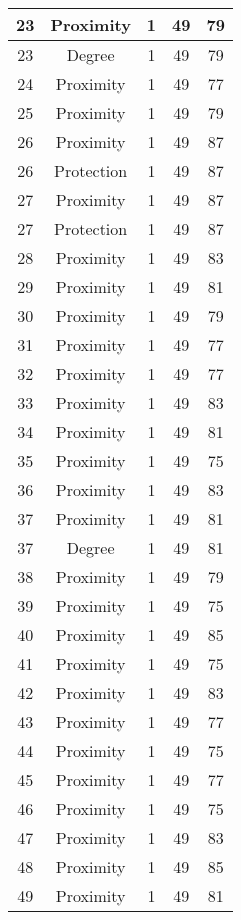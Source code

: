 \documentclass[results.tex]{subfiles}
\begin{document}
\begin{center}
\begin{tabular}{| c || c | c | c | c |}
    \hline
    23 & Proximity & 1 & 49 & 79 \\ 
    \hline
    23 & Degree & 1 & 49 & 79 \\ 
    \hline
    24 & Proximity & 1 & 49 & 77 \\ 
    \hline
    25 & Proximity & 1 & 49 & 79 \\ 
    \hline
    26 & Proximity & 1 & 49 & 87 \\ 
    \hline
    26 & Protection & 1 & 49 & 87 \\ 
    \hline
    27 & Proximity & 1 & 49 & 87 \\ 
    \hline
    27 & Protection & 1 & 49 & 87 \\ 
    \hline
    28 & Proximity & 1 & 49 & 83 \\ 
    \hline
    29 & Proximity & 1 & 49 & 81 \\ 
    \hline
    30 & Proximity & 1 & 49 & 79 \\ 
    \hline
    31 & Proximity & 1 & 49 & 77 \\ 
    \hline
    32 & Proximity & 1 & 49 & 77 \\ 
    \hline
    33 & Proximity & 1 & 49 & 83 \\ 
    \hline
    34 & Proximity & 1 & 49 & 81 \\ 
    \hline
    35 & Proximity & 1 & 49 & 75 \\ 
    \hline
    36 & Proximity & 1 & 49 & 83 \\ 
    \hline
    37 & Proximity & 1 & 49 & 81 \\ 
    \hline
    37 & Degree & 1 & 49 & 81 \\ 
    \hline
    38 & Proximity & 1 & 49 & 79 \\ 
    \hline
    39 & Proximity & 1 & 49 & 75 \\ 
    \hline
    40 & Proximity & 1 & 49 & 85 \\ 
    \hline
    41 & Proximity & 1 & 49 & 75 \\ 
    \hline
    42 & Proximity & 1 & 49 & 83 \\ 
    \hline
    43 & Proximity & 1 & 49 & 77 \\ 
    \hline
    44 & Proximity & 1 & 49 & 75 \\ 
    \hline
    45 & Proximity & 1 & 49 & 77 \\ 
    \hline
    46 & Proximity & 1 & 49 & 75 \\ 
    \hline
    47 & Proximity & 1 & 49 & 83 \\ 
    \hline
    48 & Proximity & 1 & 49 & 85 \\ 
    \hline
    49 & Proximity & 1 & 49 & 81 \\ 
    \hline   \end{tabular}
\end{center}
\end{document}

